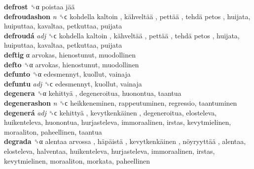 \textbf{defrost} ␝α   poistaa jää   \\
\textbf{defroudashon} \emph{n}  ␝ϲ   kohdella kaltoin ,  kähveltää ,  pettää ,  tehdä petos , huijata, huiputtaa, kavaltaa, petkuttaa, puijata  \\
\textbf{defroudá} \emph{adj}  ␝ϲ   kohdella kaltoin ,  kähveltää ,  pettää ,  tehdä petos , huijata, huiputtaa, kavaltaa, petkuttaa, puijata  \\
\textbf{deftig} α  arvokas, hienostunut, muodollinen  \\
\textbf{defto} ␝α  arvokas, hienostunut, muodollinen  \\
\textbf{defunto} ␝α  edesmennyt, kuollut, vainaja  \\
\textbf{defuntu} \emph{adj}  ␝ϲ  edesmennyt, kuollut, vainaja  \\
\textbf{degenera} ␝α   kehittyä , degeneroitua, huonontua, taantua  \\
\textbf{degenerashon} \emph{n}  ␝ϲ  heikkeneminen, rappeutuminen, regressio, taantuminen  \\
\textbf{degenerá} \emph{adj}  ␝ϲ   kehittyä ,  kevytkenkäinen , degeneroitua, elosteleva, huikenteleva, huonontua, hurjasteleva, immoraalinen, irstas, kevytmielinen, moraaliton, paheellinen, taantua  \\
\textbf{degrada} ␝α   alentaa arvossa ,  häpäistä ,  kevytkenkäinen ,  nöyryyttää , alentaa, elosteleva, halventaa, huikenteleva, hurjasteleva, immoraalinen, irstas, kevytmielinen, moraaliton, morkata, paheellinen  \\
